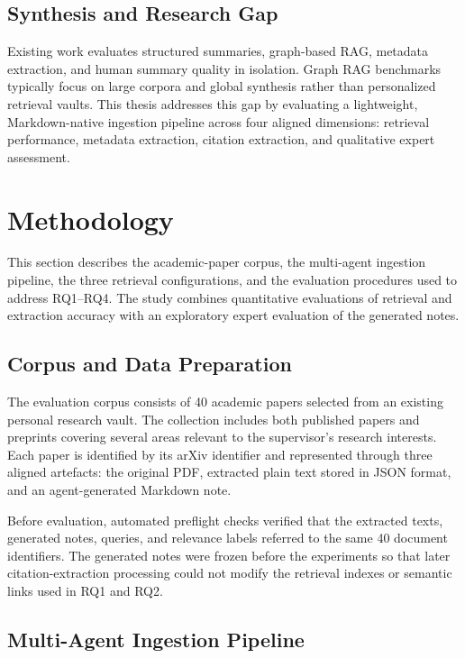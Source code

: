 \documentclass[runningheads]{llncs}
\begin{document}
\subsection{Synthesis and Research Gap}

Existing work evaluates structured summaries, graph-based RAG, metadata extraction, and human summary quality in isolation. Graph RAG benchmarks typically focus on large corpora and global synthesis rather than personalized retrieval vaults. This thesis addresses this gap by evaluating a lightweight, Markdown-native ingestion pipeline across four aligned dimensions: retrieval performance, metadata extraction, citation extraction, and qualitative expert assessment.


\section{Methodology}
\label{sec:methodology}

This section describes the academic-paper corpus, the multi-agent ingestion pipeline, the three retrieval configurations, and the evaluation procedures used to address RQ1--RQ4. The study combines quantitative evaluations of retrieval and extraction accuracy with an exploratory expert evaluation of the generated notes.

\subsection{Corpus and Data Preparation}
\label{sec:corpus}

The evaluation corpus consists of 40 academic papers selected from an existing personal research vault. The collection includes both published papers and preprints covering several areas relevant to the supervisor's research interests. Each paper is identified by its arXiv identifier and represented through three aligned artefacts: the original PDF, extracted plain text stored in JSON format, and an agent-generated Markdown note.

Before evaluation, automated preflight checks verified that the extracted texts, generated notes, queries, and relevance labels referred to the same 40 document identifiers. The generated notes were frozen before the experiments so that later citation-extraction processing could not modify the retrieval indexes or semantic links used in RQ1 and RQ2.

\subsection{Multi-Agent Ingestion Pipeline}
\label{sec:agent_pipeline}
\end{document}
